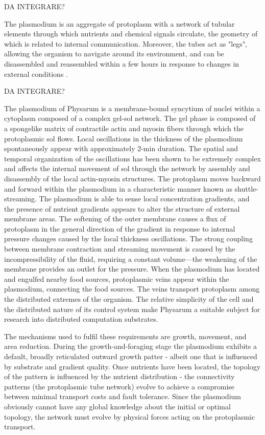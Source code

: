 \par
DA INTEGRARE? 
\par
The plasmodium is an aggregate of protoplasm with a network of tubular elements through which nutrients and chemical signals circulate, the geometry of which is related to internal communication. Moreover, the tubes act as "legs", allowing the organism to navigate around its environment, and can be disassembled and reassembled within a few hours in response to changes in external conditions \cite{nakagaki2004obtaining}.





\par
DA INTEGRARE? 
\par
The plasmodium of Physarum is a membrane-bound syncytium of nuclei within a cytoplasm composed of a complex gel-sol network. The gel phase is composed of a spongelike matrix of contractile actin and myosin fibers through which the protoplasmic sol flows. Local oscillations in the thickness of the plasmodium spontaneously appear with approximately 2-min duration. The spatial and temporal organization of the oscillations has been shown to be extremely complex and affects the internal movement of sol through the network by assembly and disassembly of the local actin-myosin structures. The protoplasm moves backward and forward within the plasmodium in a characteristic manner known as shuttle-streaming.
The plasmodium is able to sense local concentration gradients, and the presence of nutrient gradients appears to alter the structure of external membrane areas. The softening of the outer membrane causes a flux of protoplasm in the general direction of the gradient in response to internal pressure changes caused by the local thickness oscillations. The strong coupling between membrane contraction and streaming movement is caused by the incompressibility of the fluid, requiring a constant volume—the weakening of the membrane provides an outlet for the pressure. When the plasmodium has located and engulfed nearby food sources, protoplasmic veins appear within the plasmodium, connecting the food sources. The veins transport protoplasm among the distributed extremes of the organism.
The relative simplicity of the cell and the distributed nature of its control system make Physarum a suitable subject for research into distributed computation substrates. \cite{jones2010characteristics}

The mechanisms used to fulfil these requirements are growth, movement, and area reduction. During the growth-and-foraging stage the plasmodium exhibits a default, broadly reticulated outward growth patter - albeit one that is influenced by substrate and gradient quality. Once nutrients have been located, the topology of the pattern is influenced by the nutrient distribution - the connectivity patterns (the protoplasmic tube network) evolve to achieve a compromise between minimal transport costs and
fault tolerance. Since the plasmodium obviously cannot have any global knowledge about the initial or optimal topology, the network must evolve by physical forces acting on the protoplasmic transport.





